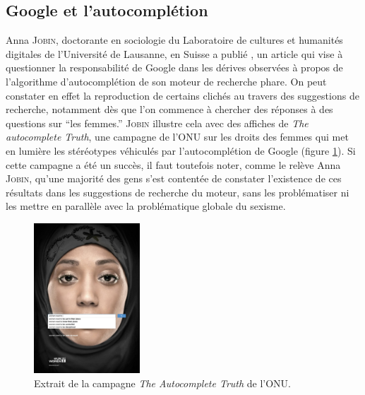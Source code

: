 \documentclass[a4paper,12pt]{report}
\begin{document}
\subsection{Google et l'autocomplétion}

Anna \textsc{Jobin}, doctorante en sociologie du Laboratoire de cultures et humanités digitales de l'Université de Lausanne, en Suisse a publié \cite{gaa}, un article qui vise à questionner la responsabilité de Google dans les dérives observées à propos de l'algorithme d'autocomplétion de son moteur de recherche phare. On peut constater en effet la reproduction de certains clichés au travers des suggestions de recherche, notamment dès que l'on commence à chercher des réponses à des questions sur ``les femmes.'' \textsc{Jobin} illustre cela avec des affiches de \textit{The autocomplete Truth}, une campagne de l'ONU sur les droits des femmes qui met en lumière les stéréotypes véhiculés par l'autocomplétion de Google (figure \ref{campagne}). Si cette campagne a été un succès, il faut toutefois noter, comme le relève Anna \textsc{Jobin}, qu'une majorité des gens s'est contentée de constater l'existence de ces résultats dans les suggestions de recherche du moteur, sans les problématiser ni les mettre en parallèle avec la problématique globale du sexisme.

\begin{figure}[ht]
 \begin{center}
  \includegraphics[width=150px]{campagne.jpg}
 \end{center}
 \caption{Extrait de la campagne \textit{The Autocomplete Truth} de l'ONU.}
 \label{campagne}
\end{figure}
\end{document}
